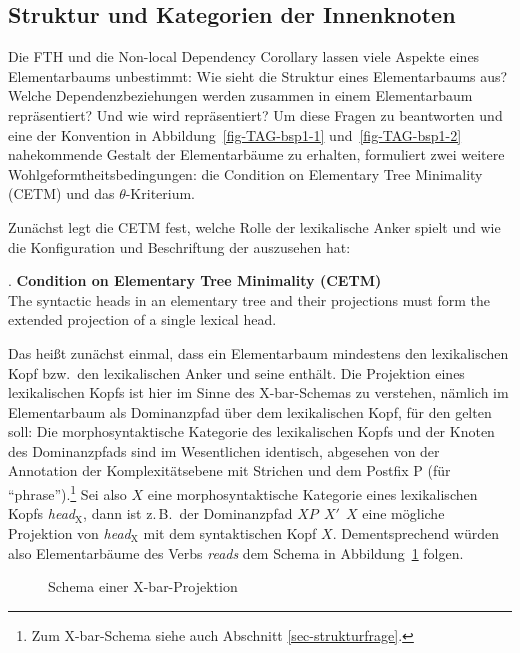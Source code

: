 \subsection{Struktur und Kategorien der Innenknoten}

Die FTH und die Non-local Dependency Corollary lassen viele Aspekte eines Elementarbaums unbestimmt: Wie sieht die Struktur eines Elementarbaums aus? Welche Dependenzbeziehungen werden zusammen in einem Elementarbaum repräsentiert? Und wie wird  repräsentiert?  Um diese Fragen zu beantworten und eine der Konvention in Abbildung~\ref{fig-TAG-bsp1-1} und~\ref{fig-TAG-bsp1-2} nahekommende Gestalt der Elementarbäume zu erhalten, formuliert \cite{Frank:02} zwei weitere Wohlgeformtheitsbedingungen: die Condition on Elementary Tree Minimality (CETM) und das $\theta$-Kriterium. 

Zunächst legt die CETM fest, welche Rolle der lexikalische Anker spielt und wie die Konfiguration und Beschriftung der  auszusehen hat:

\ex. {\bf Condition on Elementary Tree Minimality (CETM)} \label{ex-cetm} \\
The syntactic heads in an elementary tree and their projections must form the extended projection of a single lexical head.
\citep[54]{Frank:02}

Das hei\ss t zunächst einmal, dass ein Elementarbaum mindestens den lexikalischen Kopf bzw.\ den lexikalischen Anker und seine  enthält. Die Projektion eines lexikalischen Kopfs ist hier im Sinne des X-bar-Schemas \citep{Chomsky:70} zu verstehen, nämlich im Elementarbaum als Dominanzpfad über dem lexikalischen Kopf, für den gelten soll: Die morphosyntaktische Kategorie des lexikalischen Kopfs und der Knoten des Dominanzpfads sind im Wesentlichen identisch, abgesehen von der Annotation der Komplexitätsebene mit Strichen und dem Postfix P (für "`phrase"').\footnote{Zum X-bar-Schema siehe auch Abschnitt \ref{sec-strukturfrage}.} Sei also $X$ eine morphosyntaktische Kategorie eines lexikalischen Kopfs {\it head$_{\text{X}}$}, dann ist z.\,B.\ der Dominanzpfad $X\!P ~~ X' ~~ X$ eine mögliche Projektion von {\it head$_{\text{X}}$} mit dem syntaktischen Kopf $X$. Dementsprechend würden also Elementarbäume des Verbs \textit{reads} dem Schema in Abbildung~\ref{fig-cetm-1} folgen.
 
\begin{figure}[t]
\centering
{}
\caption{\label{fig-cetm-1}Schema einer X-bar-Projektion}
\end{figure}

